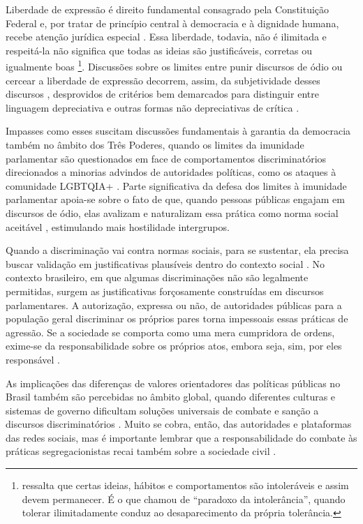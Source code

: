 \documentclass[portuguese]{textolivre}
\begin{document}
Liberdade de expressão é direito fundamental consagrado pela Constituição Federal e, por tratar de princípio central à democracia e à dignidade humana, recebe atenção jurídica especial \cite{luccas2020}. Essa liberdade, todavia, não é ilimitada e respeitá-la não significa que todas as ideias são justificáveis, corretas ou igualmente boas \cite{moshman2020}\footnote{\textcite{eco2022} ressalta que certas ideias, hábitos e comportamentos são intoleráveis e assim devem permanecer. É o que \textcite{popper1974} chamou de “paradoxo da intolerância”, quando tolerar ilimitadamente conduz ao desaparecimento da própria tolerância.}. Discussões sobre os limites entre punir discursos de ódio ou cercear a liberdade de expressão decorrem, assim, da subjetividade desses discursos \cite{garg2023handling}, desprovidos de critérios bem demarcados para distinguir entre linguagem depreciativa e outras formas não depreciativas de crítica \cite{bilewicz2020hate}.

Impasses como esses suscitam discussões fundamentais à garantia da democracia também no âmbito dos Três Poderes, quando os limites da imunidade parlamentar são questionados \cite{costa2020discurso} em face de comportamentos discriminatórios direcionados a minorias advindos de autoridades políticas, como os ataques à comunidade LGBTQIA+ \cite{dalmolin2015, pimentel2023, pinho2022}. Parte significativa da defesa dos limites à imunidade parlamentar apoia-se sobre o fato de que, quando pessoas públicas engajam em discursos de ódio, elas avalizam e naturalizam essa prática como norma social aceitável \cite{crandall2002social}, estimulando mais hostilidade intergrupos.

Quando a discriminação vai contra normas sociais, para se sustentar, ela precisa buscar validação em justificativas plausíveis dentro do contexto social \cite{modesto2018racismo}. No contexto brasileiro, em que algumas discriminações não são legalmente permitidas, surgem as justificativas forçosamente construídas em discursos parlamentares. A autorização, expressa ou não, de autoridades públicas para a população geral discriminar os próprios pares torna impessoais essas práticas de agressão. Se a sociedade se comporta como uma mera cumpridora de ordens, exime-se da responsabilidade sobre os próprios atos, embora seja, sim, por eles responsável \cite{cattani2020}.

As implicações das diferenças de valores orientadores das políticas públicas no Brasil também são percebidas no âmbito global, quando diferentes culturas e sistemas de governo dificultam soluções universais de combate e sanção a discursos discriminatórios \cite{pereira2020regulaccao}. Muito se cobra, então, das autoridades e plataformas das redes sociais, mas é importante lembrar que a responsabilidade do combate às práticas segregacionistas recai também sobre a sociedade civil \cite{kaczmarczyk2019online}.
\end{document}
